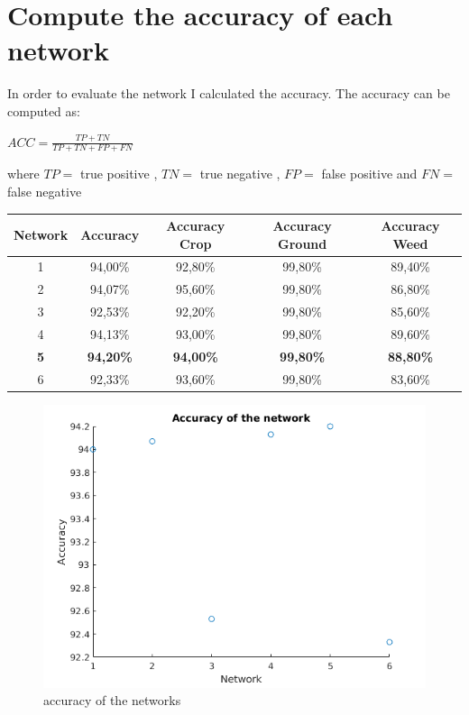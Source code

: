 \documentclass[]{report}
\begin{document}
\section{Compute the accuracy of each network}

In order to evaluate the network I calculated the accuracy. The accuracy can be computed as:

\begin{center}

	$ ACC= \frac{TP+TN}{TP+TN+FP+FN} $

\end{center}

where $ TP = $ true positive , $ TN =$ true negative , $ FP =$ false positive  and $ FN =$ false negative 


\begin{table}[h]
\centering

\begin{tabular}{|c|c|c|c|c|}
 \hline
 \textbf{Network} & \textbf{Accuracy} & \textbf{Accuracy Crop} & \textbf{Accuracy Ground} & \textbf{Accuracy Weed} \\ \hline
 1 & 94,00\% & 92,80\%  & 99,80\%  & 89,40\%  \\ \hline
 2 & 94,07\% & 95,60\%  & 99,80\%  & 86,80\%  \\ \hline
 3 & 92,53\% & 92,20\%  & 99,80\%  & 85,60\%  \\ \hline
 4 & 94,13\% & 93,00\%  & 99,80\%  & 89,60\%  \\ \hline
 \textbf{5} & \textbf{94,20\%} & \textbf{94,00\%}  & \textbf{99,80\%}  & \textbf{88,80\%}  \\ \hline
 6 & 92,33\% & 93,60\%  & 99,80\%  & 83,60\%  \\ \hline
\end{tabular}
\end{table}

\begin{figure}[h]
	\begin{center}
		\includegraphics[scale=0.4]{accuracy.png}
		\caption{accuracy of the networks}
		\label{fig:accuracyNetworks}
	\end{center}
\end{figure}
\end{document}
